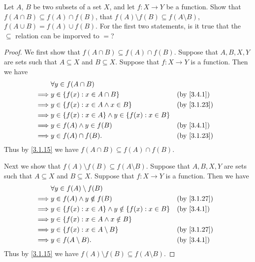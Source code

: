 \begin{ex}\label{ex:3.4.3}
  Let \(A\), \(B\) be two subsets of a set \(X\), and let \(f : X \to Y\) be a function.
  Show that \(f(A \cap B) \subseteq f(A) \cap f(B)\), that \(f(A) \setminus f(B) \subseteq f(A \setminus B)\), \(f(A \cup B) = f(A) \cup f(B)\).
  For the first two statements, is it true that the \(\subseteq\) relation can be imporved to \(=\)?
\end{ex}

\begin{proof}
  We first show that \(f(A \cap B) \subseteq f(A) \cap f(B)\).
  Suppose that \(A, B, X, Y\) are sets such that \(A \subseteq X\) and \(B \subseteq X\).
  Suppose that \(f : X \to Y\) is a function.
  Then we have
  \begin{align*}
             & \forall y \in f(A \cap B)                                                              \\
    \implies & y \in \{f(x) : x \in A \cap B\}                         &  & \by{3.4.1}                \\
    \implies & y \in \{f(x) : x \in A \land x \in B\}                  &  & \text{(by \cref{3.1.23})} \\
    \implies & y \in \{f(x) : x \in A\} \land y \in \{f(x) : x \in B\}                                \\
    \implies & y \in f(A) \land y \in f(B)                             &  & \by{3.4.1}                \\
    \implies & y \in f(A) \cap f(B).                                   &  & \text{(by \cref{3.1.23})}
  \end{align*}
  Thus by \cref{3.1.15} we have \(f(A \cap B) \subseteq f(A) \cap f(B)\).

  Next we show that \(f(A) \setminus f(B) \subseteq f(A \setminus B)\).
  Suppose that \(A, B, X, Y\) are sets such that \(A \subseteq X\) and \(B \subseteq X\).
  Suppose that \(f : X \to Y\) is a function.
  Then we have
  \begin{align*}
             & \forall y \in f(A) \setminus f(B)                                                         \\
    \implies & y \in f(A) \land y \notin f(B)                             &  & \text{(by \cref{3.1.27})} \\
    \implies & y \in \{f(x) : x \in A\} \land y \notin \{f(x) : x \in B\} &  & \by{3.4.1}                \\
    \implies & y \in \{f(x) : x \in A \land x \notin B\}                                                 \\
    \implies & y \in \{f(x) : x \in A \setminus B\}                       &  & \text{(by \cref{3.1.27})} \\
    \implies & y \in f(A \setminus B).                                    &  & \by{3.4.1}
  \end{align*}
  Thus by \cref{3.1.15} we have \(f(A) \setminus f(B) \subseteq f(A \setminus B)\).


\end{proof}
